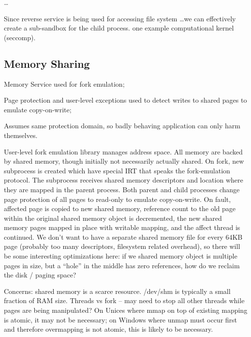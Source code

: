 \ldots

Since reverse service is being used for accessing file system \ldots we
can effectively create a sub-sandbox for the child process. one example
computational kernel (seccomp).

\subsection{Memory Sharing}
\label{sub:memory_sharing}

\begin{structure}
\item Memory Service used for fork emulation;
\item Page protection and user-level exceptions used to detect
  writes to shared pages to emulate copy-on-write;
\item Assumes same protection domain, so badly behaving application
  can only harm themselves.
\end{structure}

User-level fork emulation library manages address space.  All memory
are backed by shared memory, though initially not necessarily actually
shared.  On fork, new subprocess is created which have special IRT
that speaks the fork-emulation protocol.  The subprocess receives
shared memory descriptors and location where they are mapped in the
parent process.  Both parent and child processes change page
protection of all pages to read-only to emulate copy-on-write.  On
fault, affected page is copied to new shared memory, reference count
to the old page within the original shared memory object is
decremented, the new shared memory pages mapped in place with writable
mapping, and the affect thread is continued.  We don't want to have a
separate shared memory file for every 64KB page (probably too many
descriptors, filesystem related overhead), so there will be some
interesting optimizations here: if we shared memory object is multiple
pages in size, but a ``hole'' in the middle has zero references, how
do we reclaim the disk / paging space?

Concerns: shared memory is a scarce resource.  /dev/shm is typically a
small fraction of RAM size.  Threads vs fork -- may need to stop all
other threads while pages are being manipulated?  On Unices where mmap
on top of existing mapping is atomic, it may not be necessary; on
Windows where unmap must occur first and therefore overmapping is not
atomic, this is likely to be necessary.
